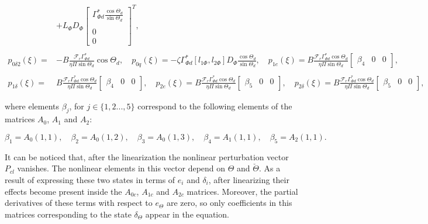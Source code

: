 \documentclass[main.tex]{subfiles}
\begin{document}
\begin{align}
		&+ L_\Phi D_\Phi\begin{bmatrix}\Gamma_{\Phi d}^*\frac{\cos \Theta_d}{\sin \Theta_d} \\\\0\\0\end{bmatrix}^T, \nonumber	\\
		\nonumber \\
		p_{0\delta 2}(\xi) =& -B\frac{\mathcal{F}_r \Gamma_{\Phi d}^*}{\eta \Pi \sin \Theta_d}\cos \Theta_d, \quad
		p_{0q}(\xi)= -\zeta \Gamma_{\Phi d}^* [l_{1\Phi},l_{2\Phi}]D_\Phi\frac{\cos \Theta_d}{\sin \Theta_d}, \quad p_{1e}(\xi) = B\frac{\mathcal{F}_r \Gamma_{\Phi d}^* \cos \Theta_d}{\eta \Pi \sin \Theta_d}\begin{bmatrix}\beta_4 & 0 & 0\end{bmatrix}, \nonumber \\
		\nonumber \\
		p_{1\delta}(\xi) =& B\frac{\mathcal{F}_r \Gamma_{\Phi d}^* \cos \Theta_d}{\eta \Pi \sin \Theta_d}\begin{bmatrix}\beta_4& 0 & 0\end{bmatrix}, \quad p_{2e}(\xi) = B\frac{\mathcal{F}_r \Gamma_{\Phi d}^* \cos \Theta_d}{\eta \Pi \sin \Theta_d}\begin{bmatrix}\beta_5& 0 & 0\end{bmatrix}, \quad p_{2\delta}(\xi) = B\frac{\mathcal{F}_r \Gamma_{\Phi d}^* \cos \Theta_d}{\eta \Pi \sin \Theta_d}\begin{bmatrix}\beta_5& 0 & 0\end{bmatrix}, \nonumber 		
	\end{align}
	
	where elements $\beta_j$, for $j \in \{1,2...,5\}$ correspond to the following elements of the matrices $A_0$, $A_1$ and $A_2$:
	
	\begin{equation*}
		\beta_1 = A_0(1,1), \quad \beta_2 = A_0(1,2), \quad \beta_3 = A_0(1,3), \quad \beta_4 = A_1(1,1), \quad \beta_5 = A_2(1,1).
	\end{equation*}
	
	It can be noticed that, after the linearization the nonlinear perturbation vector $P_{cl}$ vanishes. The nonlinear elements in this vector depend on $\Theta$ and $\check{\Theta}$. As a result of expressing these two states in terms of $e_i$ and $\delta_i$, after linearizing their effects become present inside the $A_{0c}$, $A_{1c}$ and $A_{2c}$ matrices. Moreover, the partial derivatives of these terms with respect to $e_\Theta$ are zero, so only coefficients in this matrices corresponding to the state $\delta_\Theta$ appear in the equation.
	


	
	\newpage
	
\end{document}
